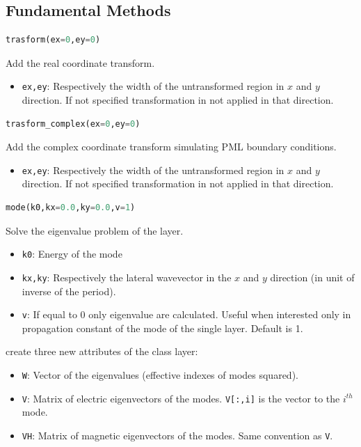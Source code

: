 \documentclass[a4paper,10pt]{report}
\begin{document}
\subsection{Fundamental Methods}
\begin{lstlisting}[language=Python,basicstyle=\ttfamily\Large]
trasform(ex=0,ey=0)
\end{lstlisting}
Add the real coordinate transform.
\begin{itemize}[noitemsep,topsep=0pt,parsep=0pt,partopsep=0pt]
\item \texttt{ex,ey}: Respectively the width of the untransformed region in $x$ and $y$ direction. If not specified transformation in not applied in that direction.
\end{itemize}

\begin{lstlisting}[language=Python,basicstyle=\ttfamily\Large]
trasform_complex(ex=0,ey=0)
\end{lstlisting}
Add the complex coordinate transform simulating PML boundary conditions. 
\begin{itemize}[noitemsep,topsep=0pt,parsep=0pt,partopsep=0pt]
\item \texttt{ex,ey}: Respectively the width of the untransformed region in $x$ and $y$ direction. If not specified transformation in not applied in that direction.
\end{itemize}

\begin{lstlisting}[language=Python,basicstyle=\ttfamily\Large]
mode(k0,kx=0.0,ky=0.0,v=1)
\end{lstlisting}
Solve the eigenvalue problem of the layer.
\begin{itemize}[noitemsep,topsep=0pt,parsep=0pt,partopsep=0pt]
\item \texttt{k0}: Energy of the mode
\item \texttt{kx,ky}: Respectively the lateral wavevector in the $x$ and $y$ direction (in unit of inverse of the period).
\item  \texttt{v}: If equal to 0 only eigenvalue are calculated. Useful when interested only in propagation constant of the mode of the single layer. Default is 1.
\end{itemize}
create three new attributes of the class layer:
\begin{itemize}[noitemsep,topsep=0pt,parsep=0pt,partopsep=0pt]
\item \texttt{W}: Vector of the eigenvalues (effective indexes of modes squared). 
\item \texttt{V}: Matrix of electric eigenvectors of the modes. \texttt{V[:,i]} is the vector to the $i^{th}$ mode.
\item \texttt{VH}: Matrix of magnetic eigenvectors of the modes. Same convention as \texttt{V}.
\end{itemize}
\end{document}
